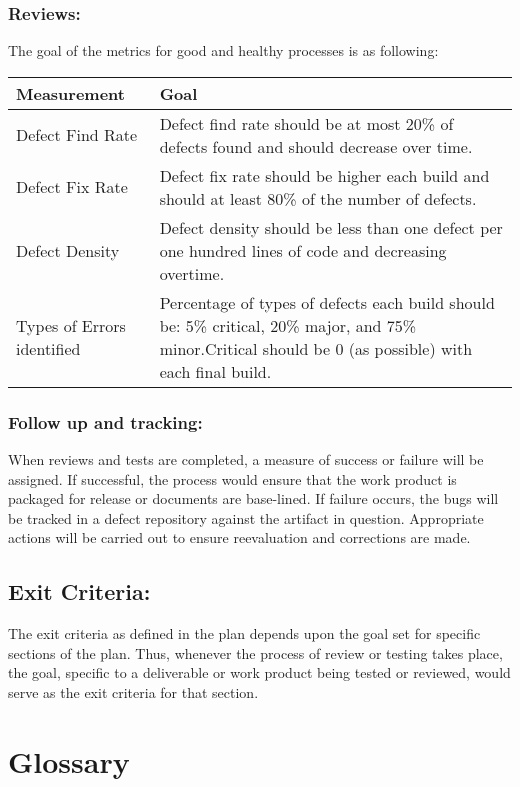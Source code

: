 \documentclass[a3paper, 11pt]{article}
\begin{document}
\subsubsection{Reviews:}
The goal of the metrics for good and healthy processes is as following:\\
\begin{tabular}{|p{3cm}|p{12.4cm}|}
	\hline
	\textbf{Measurement} & \textbf{Goal} \\ \hline
	Defect Find Rate & Defect find rate should be at most 20\% of defects found and should decrease over time. \\ \hline
	Defect Fix Rate & Defect fix rate should be higher each build and should at least 80\% of the number of defects. \\ \hline
	Defect Density & Defect density should be less than one defect per one hundred lines of code and decreasing overtime. \\ \hline
	Types of Errors identified & Percentage of types of defects each build should be: 5\% critical, 20\% major, and 75\% minor.Critical should be 0 (as possible) with each final build. \\ \hline
\end{tabular}

\subsubsection{Follow up and tracking: }
When reviews and tests are completed, a measure of success or failure will be assigned. If successful, the process would ensure that the work product is packaged for release or documents are base-lined. If failure occurs, the bugs will be tracked in a defect repository against the artifact in question. Appropriate actions will be carried out to ensure reevaluation and corrections are made. 

\subsection{Exit Criteria:}
The exit criteria as defined in the plan depends upon the goal set for specific sections of the plan. Thus, whenever the process of review or testing takes place, the goal, specific to a deliverable or work product being tested or reviewed, would serve as the exit criteria for that section. 
\par


\section{Glossary}
\end{document}
